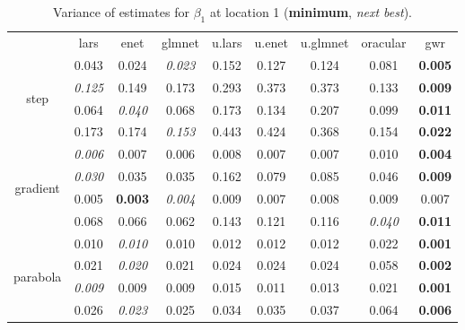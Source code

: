 \documentclass[authoryear, review, 11pt]{elsarticle}
\begin{document}
\begin{table}[ht]
\begin{center}
\begin{tabular}{ccccccccc}
  & lars & enet & glmnet & u.lars & u.enet & u.glmnet & oracular & gwr \\ 
  \cline{2-9}
  \multirow{4}{*}{step} & 0.043 & 0.024 & \emph{0.023} & 0.152 & 0.127 & 0.124 & 0.081 & \textbf{0.005} \\ 
  & \emph{0.125} & 0.149 & 0.173 & 0.293 & 0.373 & 0.373 & 0.133 & \textbf{0.009} \\ 
  & 0.064 & \emph{0.040} & 0.068 & 0.173 & 0.134 & 0.207 & 0.099 & \textbf{0.011} \\ 
  & 0.173 & 0.174 & \emph{0.153} & 0.443 & 0.424 & 0.368 & 0.154 & \textbf{0.022} \\ 
  \cline{2-9}
  \multirow{4}{*}{gradient} & \emph{0.006} & 0.007 & 0.006 & 0.008 & 0.007 & 0.007 & 0.010 & \textbf{0.004} \\ 
  & \emph{0.030} & 0.035 & 0.035 & 0.162 & 0.079 & 0.085 & 0.046 & \textbf{0.009} \\ 
  & 0.005 & \textbf{0.003} & \emph{0.004} & 0.009 & 0.007 & 0.008 & 0.009 & 0.007 \\ 
  & 0.068 & 0.066 & 0.062 & 0.143 & 0.121 & 0.116 & \emph{0.040} & \textbf{0.011} \\ 
  \cline{2-9}
  \multirow{4}{*}{parabola} & 0.010 & \emph{0.010} & 0.010 & 0.012 & 0.012 & 0.012 & 0.022 & \textbf{0.001} \\ 
  & 0.021 & \emph{0.020} & 0.021 & 0.024 & 0.024 & 0.024 & 0.058 & \textbf{0.002} \\ 
  & \emph{0.009} & 0.009 & 0.009 & 0.015 & 0.011 & 0.013 & 0.021 & \textbf{0.001} \\ 
  & 0.026 & \emph{0.023} & 0.025 & 0.034 & 0.035 & 0.037 & 0.064 & \textbf{0.006} \\ 
  \end{tabular}
\caption{Variance of estimates for $\beta_1$ at location 1 (\textbf{minimum}, \emph{next best}).\label{table:loc1-X1-varx}}
\end{center}
\end{table}
\end{document}

